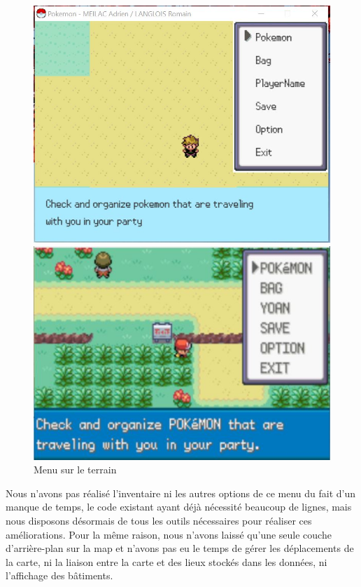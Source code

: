 \begin{figure}[!h]
\begin{minipage}{0.49\textwidth}
\includegraphics[scale = 0.6]{../Images/fieldMenu.jpg}
\end{minipage}
\begin{minipage}{0.49\textwidth}
\includegraphics[scale = 0.84]{../Images/vrai_jeu_fieldMenu.jpg}
\end{minipage}
\caption{Menu sur le terrain}
\end{figure}

Nous n'avons pas réalisé l'inventaire ni les autres options de ce menu du fait d'un manque de temps, le code existant ayant déjà nécessité beaucoup de lignes, mais nous disposons désormais de tous les outils nécessaires pour réaliser ces améliorations. Pour la même raison, nous n'avons laissé qu'une seule couche d'arrière-plan sur la map et n'avons pas eu le temps de gérer les déplacements de la carte, ni la liaison entre la carte et des lieux stockés dans les données, ni l'affichage des bâtiments.
